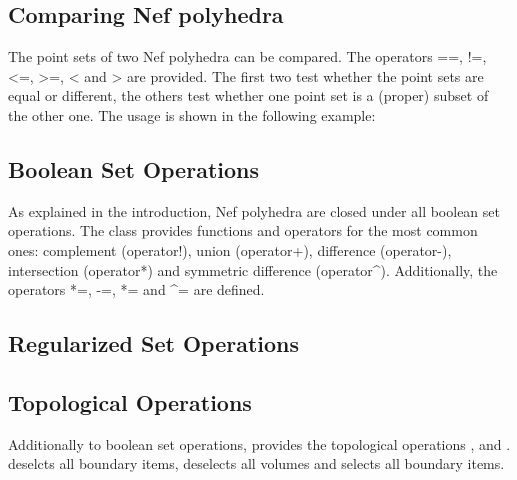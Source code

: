 
\subsection{Comparing Nef polyhedra}

The point sets of two Nef polyhedra can be compared. The operators ==, !=,
<=, >=, < and > are provided. The first two test whether the point sets 
are equal or different, the others test whether one point set is a (proper) 
subset of the other one. The usage is shown in the following example:


\subsection{Boolean Set Operations}

As explained in the introduction, Nef polyhedra are closed under all boolean 
set operations. The class  provides functions and
operators for the most common ones: complement (operator!), union (operator+), 
difference (operator-), intersection (operator*) and 
symmetric difference (operator^). Additionally, the operators 
*=, -=, *= and ^= are defined.


\subsection{Regularized Set Operations}


\subsection{Topological Operations}

Additionally to boolean set operations,  provides
the topological operations ,  and 
.  deselcts all boundary items, 
 deselects all volumes and  selects all
boundary items. 

